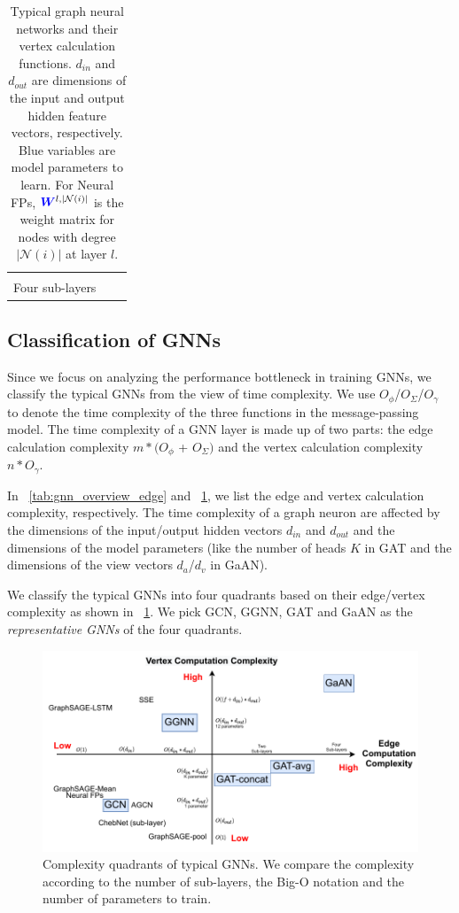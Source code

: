 \begin{table}
\begin{footnotesize}
\begin{tabular}{cp{20em}r}
			\makecell[r]{$O(max(K * d_v + d_{in}, 2 * d_{in} + d_m) * d_{out})$\\
                         Four sub-layers}
            \\ \bottomrule
		\end{tabular}
	\end{footnotesize}
	\caption{Typical graph neural networks and their vertex calculation functions.
		$d_{in}$ and $d_{out}$ are dimensions of the input and output hidden feature vectors, respectively.
		Blue variables are model parameters to learn.
		For Neural FPs, $\textcolor{blue}{\boldsymbol{W}}^{l, |\mathcal{N}(i)|}$ is the weight matrix for nodes with degree $|\mathcal{N}(i)|$ at layer $l$.}
	\label{tab:gnn_overview_vertex}
\end{table}

\subsection{Classification of GNNs}

Since we focus on analyzing the performance bottleneck in training GNNs, we classify the typical GNNs from the view of time complexity.
We use $O_\phi$/$O_\Sigma$/$O_\gamma$ to denote the time complexity of the three functions in the message-passing model.
The time complexity of a GNN layer is made up of two parts: the edge calculation complexity $m * (O_\phi$ + $O_\Sigma)$ and the vertex calculation complexity $n * O_\gamma$.

In \tablename~\ref{tab:gnn_overview_edge} and \tablename~\ref{tab:gnn_overview_vertex}, we list the edge and vertex calculation complexity, respectively.
The time complexity of a graph neuron are affected by the dimensions of the input/output hidden vectors $d_{in}$ and $d_{out}$ and the dimensions of the model parameters (like the number of heads $K$ in GAT and the dimensions of the view vectors $d_a$/$d_v$ in GaAN).

We classify the typical GNNs into four quadrants based on their edge/vertex complexity as shown in \figurename~\ref{fig:gnn_complexity_quadrant}. We pick GCN, GGNN, GAT and GaAN as the \emph{representative GNNs} of the four quadrants.

\begin{figure}
	\centering
	\includegraphics[width=0.7\columnwidth]{figs/illustration/GNN_complexity_quadrant.pdf}
	\caption{Complexity quadrants of typical GNNs. We compare the complexity according to the number of sub-layers, the Big-O notation and the number of parameters to train.}
	\label{fig:gnn_complexity_quadrant}
\end{figure}

